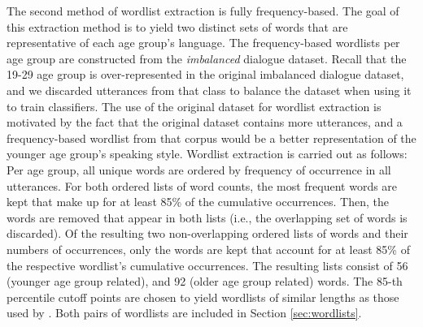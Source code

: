 The second method of wordlist extraction is fully frequency-based.
The goal of this extraction method is to yield two distinct sets of words that are representative of each age group's language. The frequency-based wordlists per age group are constructed from the \textit{imbalanced} dialogue dataset. Recall that the 19-29 age group is over-represented in the original imbalanced dialogue dataset, and we discarded utterances from that class to balance the dataset when using it to train classifiers. The use of the original dataset for wordlist extraction is motivated by the fact that the original dataset contains more utterances, and a frequency-based wordlist from that corpus would be a better representation of the younger age group's speaking style.
Wordlist extraction is carried out as follows: Per age group, all unique words are ordered by frequency of occurrence in all utterances. For both ordered lists of word counts, the most frequent words are kept that make up for at least 85\% of the cumulative occurrences.
Then, the words are removed that appear in both lists (i.e., the overlapping set of words is discarded). Of the resulting two non-overlapping ordered lists of words and their numbers of occurrences, only the words are kept that account for at least 85\% of the respective wordlist's cumulative occurrences. The resulting lists consist of 56 (younger age group related), and 92 (older age group related) words. The 85-th percentile cutoff points are chosen to yield wordlists of similar lengths as those used by \cite{dathathri2019plug}. Both pairs of wordlists are included in Section \ref{sec:wordlists}.



